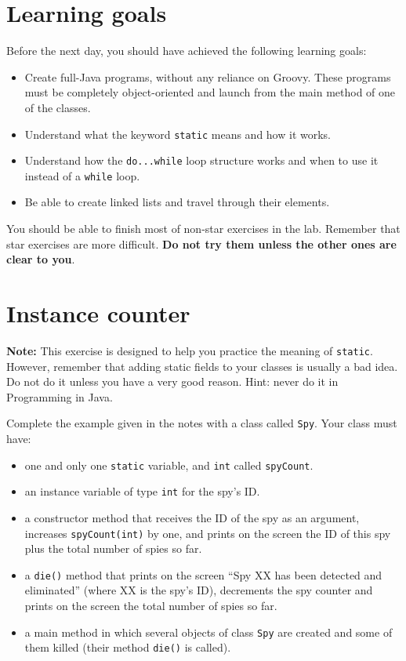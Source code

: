 \documentclass{article}
\begin{document}
\section*{Learning goals}
\label{sec:learning-goals}

Before the next day, you should have achieved the following learning
goals: 

\begin{itemize}
\item Create full-Java programs, without any reliance on Groovy. These
  programs must be completely object-oriented and launch from the main
  method of one of the classes.
\item Understand what the keyword \verb+static+ means and how it
  works. 
\item Understand how the \verb+do...while+ loop structure works and
  when to use it instead of a \verb+while+ loop.
\item Be able to create linked lists and travel through their
  elements. 
\end{itemize}

You should be able to finish most of non-star exercises in the lab. 
Remember that star exercises are more difficult. 
\textbf{Do not try them unless the other ones are clear to you}. 

\section{Instance counter}
\label{sec:instance-counter}

{\bf Note:} This exercise is designed to help you practice the meaning of
\verb+static+. However, remember that adding static fields to your
classes is usually a bad idea. Do not do it unless you have a very
good reason. Hint: never do it in Programming in Java. 

\vspace{1em}

Complete the example given in the notes with a class called
\verb+Spy+. Your class must have: 

\begin{itemize}
\item one and only one \verb+static+ variable, and \verb+int+ called
  \verb+spyCount+.
\item an instance variable of type \verb+int+ for the spy's ID.
\item a constructor method that receives
  the ID of the spy as an argument, increases
  \verb+spyCount(int)+ by one, 
  and prints on the screen the ID of this spy plus the total number of
  spies so far.
\item a \verb+die()+ method that prints on the screen ``Spy XX has
  been detected and eliminated'' (where XX is the spy's ID), 
  decrements the spy counter and prints
  on the screen the total number of spies so far. 
\item a main method in which several objects of class \verb+Spy+ are
  created and some of them killed (their method \verb+die()+ is
  called). 
\end{itemize}
\end{document}

